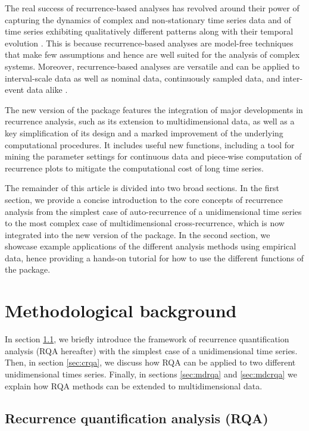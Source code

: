 The real success of recurrence-based analyses has revolved around their power of capturing the dynamics of complex and non-stationary time series data and of time series exhibiting qualitatively different patterns along with their temporal evolution \citep{marwan2007recurrence}. This is because recurrence-based analyses are model-free techniques that make few assumptions and hence are well suited for the analysis of complex systems. Moreover, recurrence-based analyses are versatile and can be applied to interval-scale data as well as nominal data, continuously sampled data, and inter-event data alike \citep{dale2011nominal,zbilut1998detecting}.

The new version of the  package features the integration of major developments in recurrence analysis, such as its extension to multidimensional data, as well as a key simplification of its design and a marked improvement of the underlying computational procedures. It includes useful new functions, including a tool for mining the parameter settings for continuous data and piece-wise computation of recurrence plots to mitigate the computational cost of long time series.

The remainder of this article is divided into two broad sections. In the first section, we provide a concise introduction to the core concepts of recurrence analysis from the simplest case of auto-recurrence of a unidimensional time series to the most complex case of multidimensional cross-recurrence, which is now integrated into the new version of the  package. In the second section, we showcase example applications of the different analysis methods using empirical data, hence providing a hands-on tutorial for how to use the different functions of the package.

\section{Methodological background}

In section \ref{sec:rqa}, we briefly introduce the framework of recurrence quantification analysis (RQA hereafter) with the simplest case of a unidimensional time series. Then, in section \ref{sec:crqa}, we discuss how RQA can be applied to two different unidimensional times series. Finally, in sections \ref{sec:mdrqa} and \ref{sec:mdcrqa} we explain how RQA methods can be extended to multidimensional data. 

\subsection{Recurrence quantification analysis (RQA)}
\label{sec:rqa}

